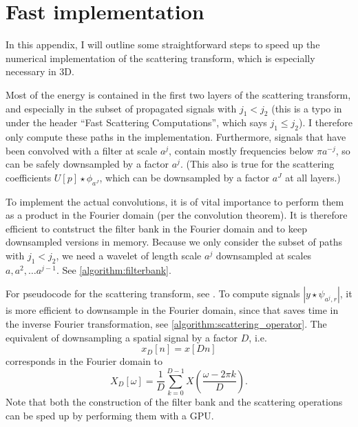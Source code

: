 \documentclass[twocolumn, openany, oneside, article]{memoir}
\begin{document}
\printbibliography

\appendix

\chapter{Fast implementation}\label{appendix:a}

In this appendix, I will outline some straightforward steps to speed up the
numerical implementation of the scattering transform, which is especially
necessary in 3D.

Most of the energy is contained in the first two layers of the scattering
transform, and especially in the subset of propagated signals with $j_1 < j_2$
\cite{bruna2013invariant, mallat2012group} (this is a typo in \cite{bruna2013}
under the header \enquote{Fast Scattering Computations}, which says $j_1 \leq
j_2$). I therefore only compute these paths in the implementation.
Furthermore, signals that have been convolved with a filter at scale $a^j$,
contain mostly frequencies below $\pi a^{-j}$, so can be safely downsampled by a factor $a^j$.
(This also is true for the scattering coefficients $U[p] \star \phi_{a^J}$, which can be downsampled by a factor
$a^J$ at all layers.)

To implement the actual convolutions, it is of vital importance to perform them
as a product in the Fourier domain (per the convolution theorem). It is therefore efficient to contstruct
the filter bank in the Fourier domain and to keep downsampled versions in memory. Because we only
consider the subset of paths with $j_1 < j_2$, we need a wavelet of length scale $a^j$ downsampled at
scales $a, a^{2}, \dots a^{j-1}$. See \autoref{algorithm:filterbank}.

For pseudocode for the scattering transform, see \cite{bruna2013invariant}.
To compute signals $|y \star \psi_{a^j, r}|$, it is more efficient to downsample in the Fourier domain,
since that saves time in the inverse Fourier transformation, see \autoref{algorithm:scattering_operator}.
The equivalent of downsampling a spatial signal by a factor $D$, i.e.
\begin{equation}
  x_D[n] = x[Dn]
\end{equation}
corresponds in the Fourier domain to
\begin{equation}
  X_D[\omega] = \frac{1}{D}\sum_{k=0}^{D-1}X(\frac{\omega - 2 \pi k}{D}).
\end{equation}
Note that both the construction of the filter bank and the scattering operations can be sped up
by performing them with a GPU.
\end{document}
